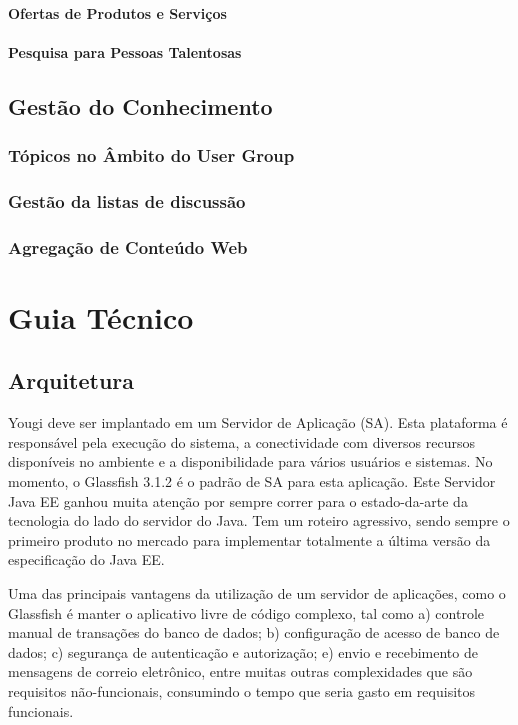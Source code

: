 \documentclass[envcountsame,envcountchap,letterpaper]{svmono}
\begin{document}
\subsection{Ofertas de Produtos e Serviços}

\subsection{Pesquisa para Pessoas Talentosas}

\chapter{Gestão do Conhecimento}

\section{Tópicos no Âmbito do User Group}

\section{Gestão da listas de discussão}

\section{Agregação de Conteúdo Web}

\part{Guia Técnico}

\chapter{Arquitetura}

Yougi deve ser implantado em um Servidor de Aplicação (SA). Esta plataforma é responsável pela execução do sistema, a conectividade com diversos recursos disponíveis no ambiente e a disponibilidade para vários usuários e sistemas. No momento, o Glassfish 3.1.2 é o padrão de SA para esta aplicação. Este Servidor Java EE ganhou muita atenção por sempre correr para o estado-da-arte da tecnologia do lado do servidor do Java. Tem um roteiro agressivo, sendo sempre o primeiro produto no mercado para implementar totalmente a última versão da especificação do Java EE.

Uma das principais vantagens da utilização de um servidor de aplicações, como o Glassfish é manter o aplicativo livre de código complexo, tal como a) controle manual de transações do banco de dados; b) configuração de acesso de banco de dados; c) segurança de autenticação e autorização; e) envio e recebimento de mensagens de correio eletrônico, entre muitas outras complexidades que são requisitos não-funcionais, consumindo o tempo que seria gasto em requisitos funcionais.
\end{document}
